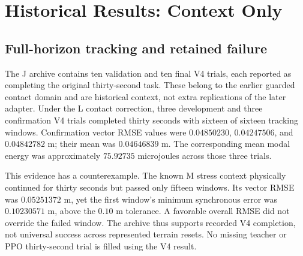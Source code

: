 \section{Historical Results: Context Only}
\subsection{Full-horizon tracking and retained failure}
The J archive contains ten validation and ten final V4 trials, each reported as completing the original thirty-second task. These belong to the earlier guarded contact domain and are historical context, not extra replications of the later adapter. Under the L contact correction, three development and three confirmation V4 trials completed thirty seconds with sixteen of sixteen tracking windows. Confirmation vector RMSE values were $0.04850230$, $0.04247506$, and $0.04842782$ m; their mean was $0.04646839$ m. The corresponding mean modal energy was approximately $75.92735$ microjoules across those three trials.

This evidence has a counterexample. The known M stress context physically continued for thirty seconds but passed only fifteen windows. Its vector RMSE was $0.05251372$ m, yet the first window's minimum synchronous error was $0.10230571$ m, above the $0.10$ m tolerance. A favorable overall RMSE did not override the failed window. The archive thus supports recorded V4 completion, not universal success across represented terrain resets. No missing teacher or PPO thirty-second trial is filled using the V4 result.

